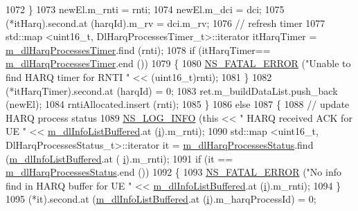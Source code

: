 \begin{DoxyCode}
1072             \}
1073           newEl.m\_rnti = rnti;
1074           newEl.m\_dci = dci;
1075           (*itHarq).second.at (harqId).m\_rv = dci.m\_rv;
1076           \textcolor{comment}{// refresh timer}
1077           std::map <uint16\_t, DlHarqProcessesTimer\_t>::iterator itHarqTimer = 
      \hyperlink{classns3_1_1FdTbfqFfMacScheduler_ae7a4cdc82a971f39b2238c472ceedf62}{m\_dlHarqProcessesTimer}.find (rnti);
1078           \textcolor{keywordflow}{if} (itHarqTimer== \hyperlink{classns3_1_1FdTbfqFfMacScheduler_ae7a4cdc82a971f39b2238c472ceedf62}{m\_dlHarqProcessesTimer}.end ())
1079             \{
1080               \hyperlink{group__fatal_ga5131d5e3f75d7d4cbfd706ac456fdc85}{NS\_FATAL\_ERROR} (\textcolor{stringliteral}{"Unable to find HARQ timer for RNTI "} << (uint16\_t)rnti);
1081             \}
1082           (*itHarqTimer).second.at (harqId) = 0;
1083           ret.m\_buildDataList.push\_back (newEl);
1084           rntiAllocated.insert (rnti);
1085         \}
1086       \textcolor{keywordflow}{else}
1087         \{
1088           \textcolor{comment}{// update HARQ process status}
1089           \hyperlink{group__logging_gafbd73ee2cf9f26b319f49086d8e860fb}{NS\_LOG\_INFO} (\textcolor{keyword}{this} << \textcolor{stringliteral}{" HARQ received ACK for UE "} << 
      \hyperlink{classns3_1_1FdTbfqFfMacScheduler_a72f4bdca7a08fcc26b1618bb9e2d0cf3}{m\_dlInfoListBuffered}.at (\hyperlink{bernuolliDistribution_8m_a6f6ccfcf58b31cb6412107d9d5281426}{i}).m\_rnti);
1090           std::map <uint16\_t, DlHarqProcessesStatus\_t>::iterator it = 
      \hyperlink{classns3_1_1FdTbfqFfMacScheduler_abc7e2984f379ab5a1855d815c439fa4f}{m\_dlHarqProcessesStatus}.find (\hyperlink{classns3_1_1FdTbfqFfMacScheduler_a72f4bdca7a08fcc26b1618bb9e2d0cf3}{m\_dlInfoListBuffered}.at (
      \hyperlink{bernuolliDistribution_8m_a6f6ccfcf58b31cb6412107d9d5281426}{i}).m\_rnti);
1091           \textcolor{keywordflow}{if} (it == \hyperlink{classns3_1_1FdTbfqFfMacScheduler_abc7e2984f379ab5a1855d815c439fa4f}{m\_dlHarqProcessesStatus}.end ())
1092             \{
1093               \hyperlink{group__fatal_ga5131d5e3f75d7d4cbfd706ac456fdc85}{NS\_FATAL\_ERROR} (\textcolor{stringliteral}{"No info find in HARQ buffer for UE "} << 
      \hyperlink{classns3_1_1FdTbfqFfMacScheduler_a72f4bdca7a08fcc26b1618bb9e2d0cf3}{m\_dlInfoListBuffered}.at (\hyperlink{bernuolliDistribution_8m_a6f6ccfcf58b31cb6412107d9d5281426}{i}).m\_rnti);
1094             \}
1095           (*it).second.at (\hyperlink{classns3_1_1FdTbfqFfMacScheduler_a72f4bdca7a08fcc26b1618bb9e2d0cf3}{m\_dlInfoListBuffered}.at (\hyperlink{bernuolliDistribution_8m_a6f6ccfcf58b31cb6412107d9d5281426}{i}).m\_harqProcessId) = 0;

\end{DoxyCode}

